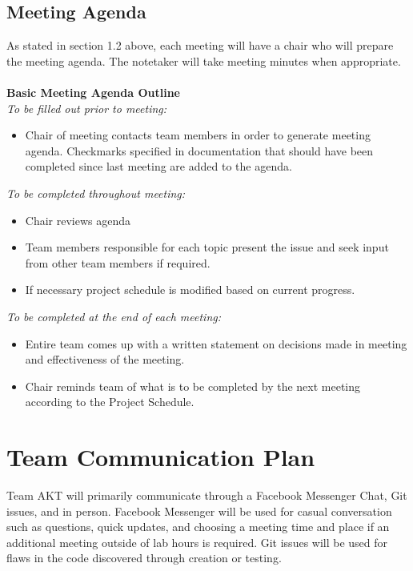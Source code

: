 \documentclass[12pt,fleqn]{article}
\begin{document}
\subsection{Meeting Agenda}
As stated in section 1.2 above, each meeting will have a chair who will prepare the meeting agenda.  The notetaker will take meeting minutes when appropriate.  \\ \\
\textbf{Basic Meeting Agenda Outline} \\ 
\textit{To be filled out prior to meeting:}
\begin{itemize}
    \item Chair of meeting contacts team members in order to generate meeting agenda.  Checkmarks specified in documentation that should have been completed since last meeting are added to the agenda.
\end{itemize} 

\textit{To be completed throughout meeting:}
\begin{itemize}
    \item Chair reviews agenda
    \item Team members responsible for each topic present the issue and seek input from other team members if required.
    \item If necessary project schedule is modified based on current progress.
\end{itemize}

\textit{To be completed at the end of each meeting:}
\begin{itemize}
    \item Entire team comes up with a written statement on decisions made in meeting and effectiveness of the meeting.
    \item Chair reminds team of what is to be completed by the next meeting according to the Project Schedule.
\end{itemize}


\section {Team Communication Plan}
Team AKT will primarily communicate through a Facebook Messenger Chat, Git issues, and in person.  Facebook Messenger will be used for casual conversation such as questions, quick updates, and choosing a meeting time and place if an additional meeting outside of lab hours is required. Git issues will be used for flaws in the code discovered through creation or testing.
\end{document}
